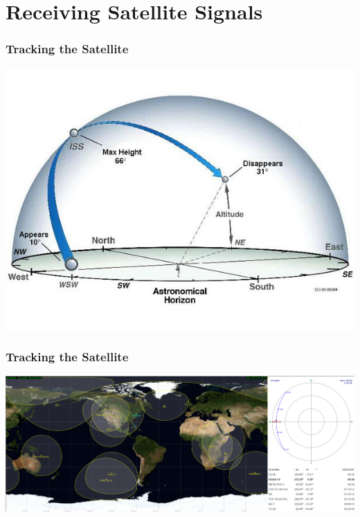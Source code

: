 \documentclass[]{beamer}
\begin{document}
\begin{frame}
\begin{columns}[T]
\begin{column}[T]{5cm}
        \end{column}
    \end{columns}
\end{frame}


\section[Reception]{Receiving Satellite Signals}
\frame{\sectionpage}
\begin{frame}
    \frametitle{Tracking the Satellite}
    \begin{center}
        \includegraphics[width=0.75\paperwidth,height=1.0\paperheight,keepaspectratio]{images/az-el-vis.png}
    \end{center}
\end{frame}
\begin{frame}
    \frametitle{Tracking the Satellite}
    \includegraphics[width=0.90\paperwidth,height=1.0\paperheight,keepaspectratio]{images/gpredict.png}
\end{frame}
\end{document}
